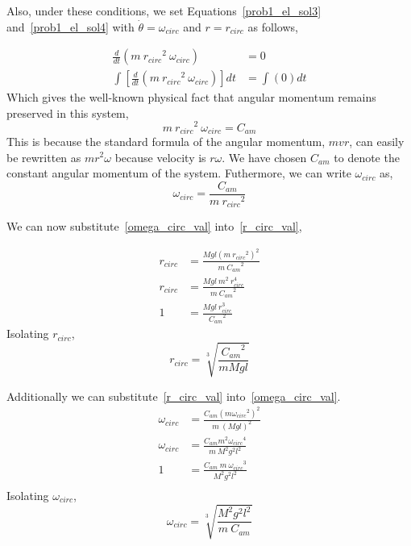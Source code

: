 \documentclass[conference]{IEEEtran}
\begin{document}
Also, under these conditions, we set Equations~\ref{prob1_el_sol3} and~\ref{prob1_el_sol4}
with $\dot{\theta} = \omega_{circ}$ and $r = r_{circ}$ as follows,

\begin{align*}
    \frac{d}{dt}\left( m~{r_{circ}}^2~\omega_{circ} \right) &= 0\\
    \int \left[ \frac{d}{dt}\left( m~{r_{circ}}^2~\omega_{circ} \right) \right] dt &= \int (0) dt
\end{align*}
Which gives the well-known physical fact that angular momentum remains preserved in this system,
\begin{equation}
    m~{r_{circ}}^2~\omega_{circ} = C_{am}
\end{equation}
This is because the standard formula of the angular momentum, $mvr$, can
easily be rewritten as $mr^2\omega$ because velocity is $r\omega$. We have
chosen $C_{am}$ to denote the constant angular momentum of the system.
Futhermore, we can write $\omega_{circ}$ as,
\begin{equation}\label{omega_circ_val}
    \omega_{circ} = \frac{C_{am}}{m~{r_{circ}}^2}
\end{equation}

We can now substitute~\ref{omega_circ_val} into~\ref{r_circ_val},

\begin{align*}
    r_{circ} &= \frac{Mgl(m~{r_{circ}}^2)^2}{m~{C_{am}}^2}\\
    r_{circ} &= \frac{Mgl~m^2~r_{circ}^4}{m~{C_{am}}^2}\\
    1 &= \frac{Mgl~r_{circ}^3}{{C_{am}}^2}
\end{align*}
Isolating $r_{circ}$,
\begin{equation}\label{prob1_obj4_r}
    r_{circ} = \sqrt[3]{\frac{{C_{am}}^2}{mMgl}}
\end{equation}

Additionally we can substitute~\ref{r_circ_val} into~\ref{omega_circ_val}.
\begin{align*}
    \omega_{circ} &= \frac{C_{am}(m{\omega_{circ}}^2)^2}{m~{(Mgl)}^2}\\
    \omega_{circ} &= \frac{C_{am}m^2{\omega_{circ}}^4}{m~M^2g^2l^2}\\
    1 &= \frac{C_{am}~m~{\omega_{circ}}^3}{M^2g^2l^2}\\
\end{align*}
Isolating $\omega_{circ}$,
\begin{equation}\label{prob4_obj4_omega}
    \omega_{circ} = \sqrt[3]{\frac{M^2g^2l^2}{m~C_{am}}}
\end{equation}
\end{document}
